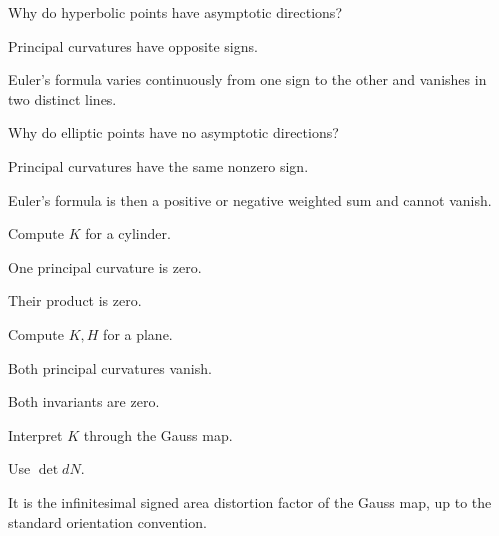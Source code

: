 \begin{exercise}\label{exr:vii17-19}
Why do hyperbolic points have asymptotic directions?
\end{exercise}
\begin{hint}
Principal curvatures have opposite signs.
\end{hint}
\begin{solution}
Euler's formula varies continuously from one sign to the other and vanishes in two distinct lines.
\end{solution}

\begin{exercise}\label{exr:vii17-20}
Why do elliptic points have no asymptotic directions?
\end{exercise}
\begin{hint}
Principal curvatures have the same nonzero sign.
\end{hint}
\begin{solution}
Euler's formula is then a positive or negative weighted sum and cannot vanish.
\end{solution}

\begin{exercise}\label{exr:vii17-21}
Compute \(K\) for a cylinder.
\end{exercise}
\begin{hint}
One principal curvature is zero.
\end{hint}
\begin{solution}
Their product is zero.
\end{solution}

\begin{exercise}\label{exr:vii17-22}
Compute \(K,H\) for a plane.
\end{exercise}
\begin{hint}
Both principal curvatures vanish.
\end{hint}
\begin{solution}
Both invariants are zero.
\end{solution}

\begin{exercise}\label{exr:vii17-23}
Interpret \(K\) through the Gauss map.
\end{exercise}
\begin{hint}
Use \(\det dN\).
\end{hint}
\begin{solution}
It is the infinitesimal signed area distortion factor of the Gauss map, up to the standard orientation convention.
\end{solution}

